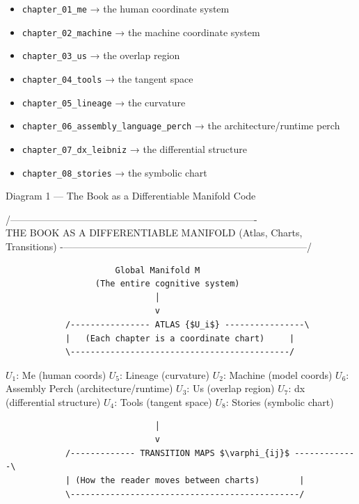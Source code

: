 \begin{itemize}
\tightlist
\item
  \texttt{chapter\_01\_me} → the human coordinate system
\item
  \texttt{chapter\_02\_machine} → the machine coordinate system
\item
  \texttt{chapter\_03\_us} → the overlap region
\item
  \texttt{chapter\_04\_tools} → the tangent space
\item
  \texttt{chapter\_05\_lineage} → the curvature
\item
  \texttt{chapter\_06\_assembly\_language\_perch} → the
  architecture/runtime perch
\item
  \texttt{chapter\_07\_dx\_leibniz} → the differential structure
\item
  \texttt{chapter\_08\_stories} → the symbolic chart
\end{itemize}

Diagram 1 --- The Book as a Differentiable Manifold Code

/----------------------------------------------------------------------------\\
\textbar{} THE BOOK AS A DIFFERENTIABLE MANIFOLD \textbar{} \textbar{}
(Atlas, Charts, Transitions) \textbar{}
-\/---------------------------------------------------------------------------/

\begin{verbatim}
                      Global Manifold M
                  (The entire cognitive system)
                              │
                              v
            /---------------- ATLAS {$U_i$} ----------------\
            |   (Each chapter is a coordinate chart)     |
            \--------------------------------------------/
\end{verbatim}

\(U_1\): Me (human coords) \(U_5\): Lineage (curvature) \(U_2\): Machine
(model coords) \(U_6\): Assembly Perch (architecture/runtime) \(U_3\):
Us (overlap region) \(U_7\): dx (differential structure) \(U_4\): Tools
(tangent space) \(U_8\): Stories (symbolic chart)

\begin{verbatim}
                              │
                              v
            /------------- TRANSITION MAPS $\varphi_{ij}$ -------------\
            | (How the reader moves between charts)        |
            \----------------------------------------------/
\end{verbatim}

